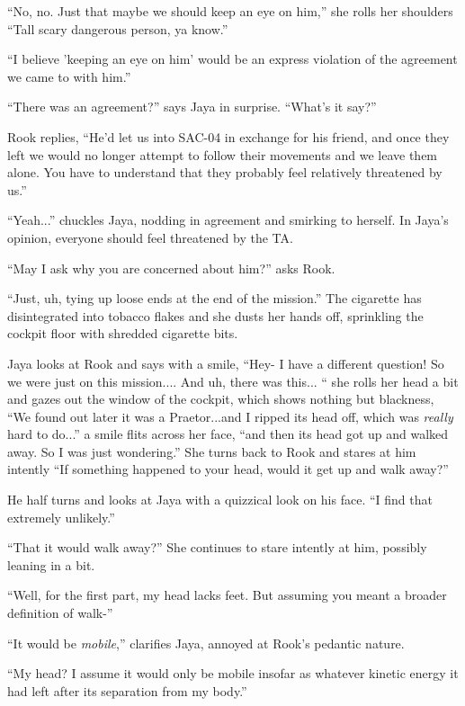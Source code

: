 ``No, no.  Just that maybe we should keep an eye on him,'' she rolls her shoulders ``Tall scary dangerous person, ya know.''

``I believe 'keeping an eye on him' would be an express violation of the agreement we came to with him.''

``There was an agreement?'' says Jaya in surprise.  ``What's it say?''

Rook replies, ``He'd let us into SAC-04 in exchange for his friend, and once they left we would no longer attempt to follow their movements and we leave them alone.  You have to understand that they probably feel relatively threatened by us.''

``Yeah...'' chuckles Jaya, nodding in agreement and smirking to herself.  In Jaya's opinion, everyone should feel threatened by the TA.

``May I ask why you are concerned about him?'' asks Rook.

``Just, uh, tying up loose ends at the end of the mission.''  The cigarette has disintegrated into tobacco flakes and she dusts her hands off, sprinkling the cockpit floor with shredded cigarette bits.  



Jaya looks at Rook and says with a smile,  ``Hey- I have a different question!  So we were just on this mission.... And uh, there was this... `` she rolls her head a bit and gazes out the window of the cockpit, which shows nothing but blackness, ``We found out later it was a Praetor...and I ripped its head off, which was \textit{really }hard to do...'' a smile flits across her face, ``and then its head got up and walked away.  So I was just wondering.'' She turns back to Rook and stares at him intently ``If something happened to your head, would it get up and walk away?''

He half turns and looks at Jaya with a quizzical look on his face.  ``I find that extremely unlikely.''

``That it would walk away?'' She continues to stare intently at him, possibly leaning in a bit.

``Well, for the first part, my head lacks feet.  But assuming you meant a broader definition of walk-''

``It would be \textit{mobile},'' clarifies Jaya, annoyed at Rook's pedantic nature.

``My head?  I assume it would only be mobile insofar as whatever kinetic energy it had left after its separation from my body.''

